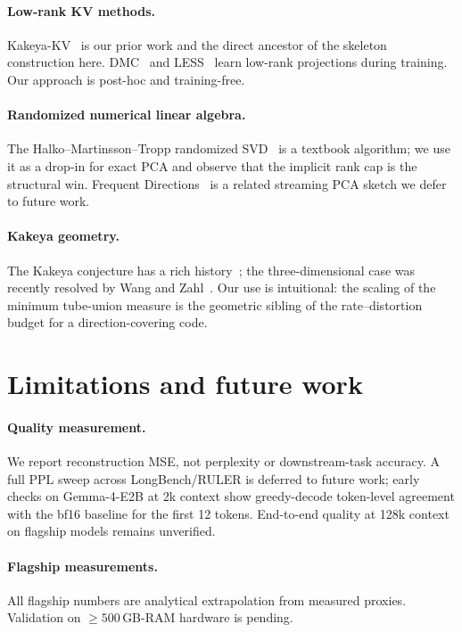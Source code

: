 \documentclass[11pt,a4paper]{article}
\theoremstyle{definition}
\theoremstyle{plain}
\begin{document}
\paragraph{Low-rank KV methods.} Kakeya-KV~\cite{kakeya-kv} is our prior work and the direct ancestor of the skeleton construction here. DMC~\cite{dmc} and LESS~\cite{less} learn low-rank projections during training. Our approach is post-hoc and training-free.

\paragraph{Randomized numerical linear algebra.} The Halko--Martinsson--Tropp randomized SVD~\cite{halko-martinsson-tropp} is a textbook algorithm; we use it as a drop-in for exact PCA and observe that the implicit rank cap is the structural win. Frequent Directions~\cite{frequent-directions} is a related streaming PCA sketch we defer to future work.

\paragraph{Kakeya geometry.} The Kakeya conjecture has a rich history~\cite{kakeya-problem}; the three-dimensional case was recently resolved by Wang and Zahl~\cite{wang-zahl}. Our use is intuitional: the scaling of the minimum tube-union measure is the geometric sibling of the rate--distortion budget for a direction-covering code.

\section{Limitations and future work}
\label{sec:limitations}

\paragraph{Quality measurement.} We report reconstruction MSE, not perplexity or downstream-task accuracy. A full PPL sweep across LongBench/RULER is deferred to future work; early checks on Gemma-4-E2B at 2k context show greedy-decode token-level agreement with the bf16 baseline for the first 12 tokens. End-to-end quality at 128k context on flagship models remains unverified.

\paragraph{Flagship measurements.} All flagship numbers are analytical extrapolation from measured proxies. Validation on $\geq 500$\,GB-RAM hardware is pending.
\end{document}
